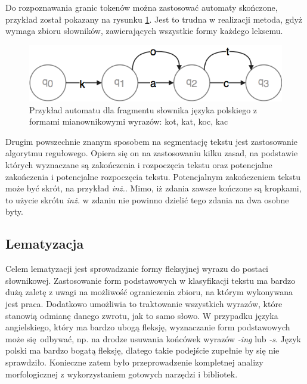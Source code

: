 Do rozpoznawania granic tokenów można zastosować automaty skończone, przykład został pokazany na rysunku \ref{fig:state-machine}. Jest to trudna w realizacji metoda, gdyż wymaga zbioru słowników, zawierających wszystkie formy każdego leksemu. 

\begin{figure}[ht!]
	\centering
	\includegraphics[width=0.6\linewidth]{img/state-machine}
	\caption{Przykład automatu dla fragmentu słownika języka polskiego z formami mianownikowymi wyrazów: kot, kat, koc, kac}
	\label{fig:state-machine}
\end{figure}
% 
% 
 Drugim powszechnie znanym sposobem na segmentację tekstu jest zastosowanie algorytmu regułowego. Opiera się on na zastosowaniu kilku zasad, na podstawie których wyznaczane są zakończenia i rozpoczęcia tekstu oraz potencjalne zakończenia i potencjalne rozpoczęcia tekstu. Potencjalnym zakończeniem tekstu może być skrót, na przykład \textit{inż.}. Mimo, iż zdania zawsze kończone są kropkami, to użycie skrótu \textit{inż.} w zdaniu nie powinno dzielić tego zdania na dwa osobne byty. \cite{rudolf-swidzinski}

\subsection{Lematyzacja}
Celem lematyzacji jest sprowadzanie formy fleksyjnej wyrazu do postaci słownikowej. Zastosowanie form podstawowych w klasyfikacji tekstu ma bardzo dużą zaletę z uwagi na możliwość ograniczenia zbioru, na którym wykonywana jest praca. Dodatkowo umożliwia to traktowanie wszystkich wyrazów, które stanowią odmianę danego zwrotu, jak to samo słowo. W przypadku języka angielskiego, który ma bardzo ubogą fleksję, wyznaczanie form podstawowych może się odbywać, np. na drodze usuwania końcówek wyrazów \textit{-ing} lub \textit{-s}. Język polski ma bardzo bogatą fleksję, dlatego takie podejście zupełnie by się nie sprawdziło. Konieczne zatem było przeprowadzenie kompletnej analizy morfologicznej z wykorzystaniem gotowych narzędzi i bibliotek.

